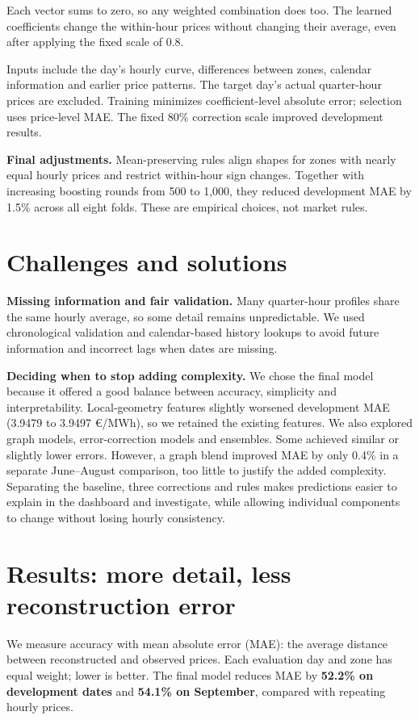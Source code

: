 \documentclass[10pt,a4paper]{article}
\begin{document}
Each vector sums to zero, so any weighted combination does too. The learned coefficients change the within-hour prices without changing their average, even after applying the fixed scale of 0.8.

Inputs include the day's hourly curve, differences between zones, calendar information and earlier price patterns. The target day's actual quarter-hour prices are excluded. Training minimizes coefficient-level absolute error; selection uses price-level MAE. The fixed 80\% correction scale improved development results.

\textbf{Final adjustments.} Mean-preserving rules align shapes for zones with nearly equal hourly prices and restrict within-hour sign changes. Together with increasing boosting rounds from 500 to 1,000, they reduced development MAE by 1.5\% across all eight folds. These are empirical choices, not market rules.


\section{Challenges and solutions}
\textbf{Missing information and fair validation.} Many quarter-hour profiles share the same hourly average, so some detail remains unpredictable. We used chronological validation and calendar-based history lookups to avoid future information and incorrect lags when dates are missing.

\textbf{Deciding when to stop adding complexity.} We chose the final model because it offered a good balance between accuracy, simplicity and interpretability. Local-geometry features slightly worsened development MAE (3.9479 to 3.9497 \euro{}/MWh), so we retained the existing features. We also explored graph models, error-correction models and ensembles. Some achieved similar or slightly lower errors. However, a graph blend improved MAE by only 0.4\% in a separate June--August comparison, too little to justify the added complexity. Separating the baseline, three corrections and rules makes predictions easier to explain in the dashboard and investigate, while allowing individual components to change without losing hourly consistency.

\newpage
\section{Results: more detail, less reconstruction error}
We measure accuracy with mean absolute error (MAE): the average distance between reconstructed and observed prices. Each evaluation day and zone has equal weight; lower is better. The final model reduces MAE by \textbf{52.2\% on development dates} and \textbf{54.1\% on September}, compared with repeating hourly prices.
\end{document}

